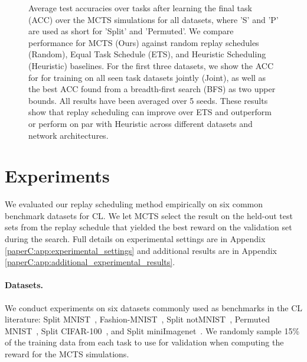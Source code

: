 
%

\begin{figure}[t]
	\centering
	\setlength{\figwidth}{0.23\textwidth}
	\setlength{\figheight}{.13\textheight}
	
	\vspace{-3mm}
	\caption{ Average test accuracies over tasks after learning the final task (ACC) over the MCTS simulations for all datasets, where 'S' and 'P' are used as short for 'Split' and 'Permuted'. We compare performance for MCTS (Ours) against random replay schedules (Random), Equal Task Schedule (ETS), and Heuristic Scheduling (Heuristic) baselines. For the first three datasets, we show the ACC for for training on all seen task datasets jointly (Joint), as well as the best ACC found from a breadth-first search (BFS) as two upper bounds. All results have been averaged over 5 seeds. These results show that replay scheduling can improve over ETS and outperform or perform on par with Heuristic across different datasets and network architectures.
	}
	\label{fig:mcts_best_rewards}
	\vspace{-3mm}
\end{figure}


\section{Experiments}\label{paperC:sec:experiments}

We evaluated our replay scheduling method empirically on six common benchmark datasets for CL. 
We let MCTS select the result on the held-out test sets from the replay schedule that yielded the best reward on the validation set during the search.%
Full details on experimental settings are in Appendix \ref{paperC:app:experimental_settings} and additional results are in Appendix \ref{paperC:app:additional_experimental_results}. 

\vspace{-3mm}
\paragraph{Datasets.} We conduct experiments on six datasets commonly used as benchmarks in the CL literature: Split MNIST~, Fashion-MNIST~, Split notMNIST~, Permuted MNIST~, Split CIFAR-100~, and Split miniImagenet~. We randomly sample 15\% of the training data from each task to use for validation when computing the reward for the MCTS simulations. 

